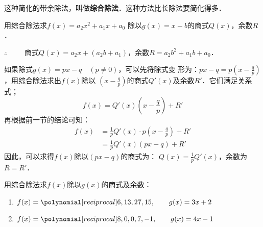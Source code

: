 这种简化的带余除法，叫做\textbf{综合除法}．这种方法比长除法要简化得多．

\begin{example}
    用综合除法求$f(x)=a_2x^2+a_1x+a_0$ 除以$g(x)=x-b$的商式$Q(x)$，余数$R$．
\end{example}

\begin{solution}
    \begin{center}
      \end{center}
$\therefore\qquad $ 商式$Q(x)=a_2x+(a_2b+a_1)$，余数$R=a_2b^2+a_1b+a_0$．
\end{solution}

如果除式$g(x)=px-q\quad (p\ne 0)$，可以先将除式变
形为：$px-q=p\left(x-\frac{q}{p}\right)$，用综合除法求出$f(x)$除以
$\left(x-\frac{q}{p}\right)$的商式$Q'(x)$及余数$R'$．它们满足关系式；
\[f(x)=Q'(x)\left(x-\frac{q}{p}\right)+R' \]
再根据前一节的结论可知：
\[\begin{split}
f(x)&=\frac{1}{p}Q'(x)\cdot p\left(x-\frac{q}{p}\right)+R'\\
&=\frac{1}{p}Q'(x)(px-q)+R'
\end{split}\]
因此，可以求得$f(x)$除以$(px-q)$的商式为：
$Q(x)=\frac{1}{p}Q'(x)$，余数为$R=R'$．

\begin{example}
    用综合除法求$f(x)$除以$g(x)$的商式及余数：
\begin{enumerate}
    \item $f(x)=\poly{6,13,27,15},\qquad g(x)=3x+2$
    \item $f(x)=\poly{8,0,0,7,-1},\qquad g(x)=4x-1$
\end{enumerate}    
\end{example}

